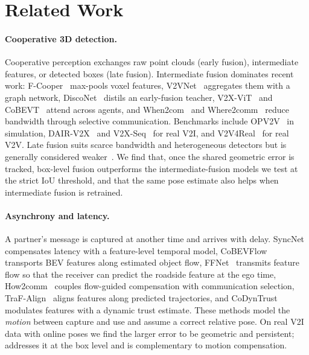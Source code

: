 \section{Related Work}
\label{sec:related}

\paragraph{Cooperative 3D detection.}
Cooperative perception exchanges raw point clouds (early fusion), intermediate features, or detected boxes (late fusion).
Intermediate fusion dominates recent work: F-Cooper~\cite{chen2019fcooper} max-pools voxel features, V2VNet~\cite{wang2020v2vnet} aggregates them with a graph network, DiscoNet~\cite{li2021disconet} distils an early-fusion teacher, V2X-ViT~\cite{xu2022v2xvit} and CoBEVT~\cite{xu2022cobevt} attend across agents, and When2com~\cite{liu2020when2com} and Where2comm~\cite{hu2022where2comm} reduce bandwidth through selective communication.
Benchmarks include OPV2V~\cite{xu2022opv2v} in simulation, DAIR-V2X~\cite{yu2022dairv2x} and V2X-Seq~\cite{yu2023v2xseq} for real V2I, and V2V4Real~\cite{xu2023v2v4real} for real V2V.
Late fusion suits scarce bandwidth and heterogeneous detectors but is generally considered weaker~\cite{yu2022dairv2x}.
We find that, once the shared geometric error is tracked, box-level fusion outperforms the intermediate-fusion models we test at the strict IoU threshold, and that the same pose estimate also helps when intermediate fusion is retrained.

\paragraph{Asynchrony and latency.}
A partner's message is captured at another time and arrives with delay.
SyncNet~\cite{lei2022syncnet} compensates latency with a feature-level temporal model, CoBEVFlow~\cite{wei2023cobevflow} transports BEV features along estimated object flow, FFNet~\cite{yu2023ffnet} transmits feature flow so that the receiver can predict the roadside feature at the ego time, How2comm~\cite{yang2023how2comm} couples flow-guided compensation with communication selection, TraF-Align~\cite{song2025trafalign} aligns features along predicted trajectories, and CoDynTrust~\cite{xu2025codyntrust} modulates features with a dynamic trust estimate.
These methods model the \emph{motion} between capture and use and assume a correct relative pose.
On real V2I data with online poses we find the larger error to be geometric and persistent; \method addresses it at the box level and is complementary to motion compensation.

